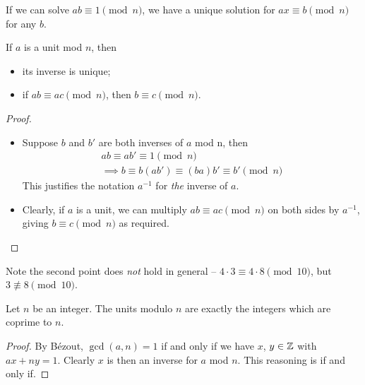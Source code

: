 \documentclass{../template/note}
\begin{document}
    \begin{remark*}
        If we can solve \(ab \equiv 1 \pmod n\), we have a unique solution for \(ax \equiv b \pmod n\) for any \(b\).
    \end{remark*}
    
    \begin{proposition}
        If \(a\) is a unit mod \(n\), then
        \begin{itemize}
            \item its inverse is unique;
            \item if \(ab \equiv ac \pmod n\), then \(b \equiv c \pmod n\).
        \end{itemize}
    \end{proposition}
    
    \begin{proof}
        \begin{itemize}
            \item Suppose \(b\) and \(b'\) are both inverses of \(a\) mod n, then
            \begin{align*}
                ab \equiv ab' \equiv 1 \pmod n \\
                \implies b \equiv b(ab') \equiv (ba)b' \equiv b' \pmod n
            \end{align*}
            This justifies the notation \(a^{-1}\) for \emph{the} inverse of \(a\).
            \item Clearly, if \(a\) is a unit, we can multiply \(ab \equiv ac \pmod n\) on both sides by \(a^{-1}\), giving \(b \equiv c \pmod n\) as required.
        \end{itemize}
    \end{proof}
    Note the second point does \emph{not} hold in general -- \(4 \cdot 3 \equiv 4 \cdot 8 \pmod{10}\), but \(3 \not\equiv 8 \pmod{10}\).

    \begin{proposition}
        Let \(n\) be an integer. The units modulo \(n\) are exactly the integers which are coprime to \(n\).
    \end{proposition}
    
    \begin{proof}
        By B\'ezout, \(\gcd(a, n) = 1\) if and only if we have \(x\), \(y \in \mathbb Z\) with \(ax + ny = 1\). Clearly \(x\) is then an inverse for \(a\) mod \(n\). This reasoning is if and only if.
    \end{proof}
    
\end{document}
